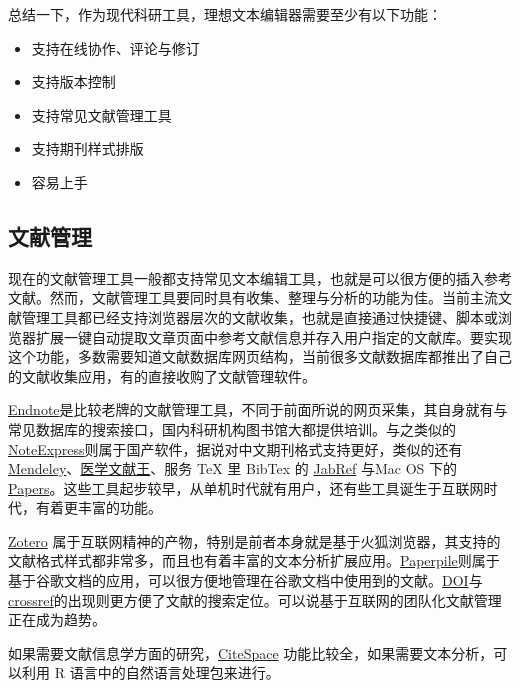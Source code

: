 \documentclass[]{tufte-book}
\providecommand{\tightlist}{%
  \setlength{\itemsep}{0pt}\setlength{\parskip}{0pt}}
\begin{document}
总结一下，作为现代科研工具，理想文本编辑器需要至少有以下功能：

\begin{itemize}
\tightlist
\item
  支持在线协作、评论与修订
\item
  支持版本控制
\item
  支持常见文献管理工具
\item
  支持期刊样式排版
\item
  容易上手
\end{itemize}

\hypertarget{ux6587ux732eux7ba1ux7406-1}{%
\subsection*{文献管理}\label{ux6587ux732eux7ba1ux7406-1}}

现在的文献管理工具一般都支持常见文本编辑工具，也就是可以很方便的插入参考文献。然而，文献管理工具要同时具有收集、整理与分析的功能为佳。当前主流文献管理工具都已经支持浏览器层次的文献收集，也就是直接通过快捷键、脚本或浏览器扩展一键自动提取文章页面中参考文献信息并存入用户指定的文献库。要实现这个功能，多数需要知道文献数据库网页结构，当前很多文献数据库都推出了自己的文献收集应用，有的直接收购了文献管理软件。

\href{https://endnote.com/}{Endnote}是比较老牌的文献管理工具，不同于前面所说的网页采集，其自身就有与常见数据库的搜索接口，国内科研机构图书馆大都提供培训。与之类似的\href{http://www.inoteexpress.com/aegean/}{NoteExpress}则属于国产软件，据说对中文期刊格式支持更好，类似的还有\href{https://www.mendeley.com/}{Mendeley}、\href{http://refer.medlive.cn/}{医学文献王}、服务 TeX 里 BibTex 的 \href{http://www.jabref.org/}{JabRef} 与Mac OS 下的\href{https://www.readcube.com/papers/mac}{Papers}。这些工具起步较早，从单机时代就有用户，还有些工具诞生于互联网时代，有着更丰富的功能。

\href{https://www.zotero.org/}{Zotero} 属于互联网精神的产物，特别是前者本身就是基于火狐浏览器，其支持的文献格式样式都非常多，而且也有着丰富的文本分析扩展应用。\href{https://paperpile.com/app}{Paperpile}则属于基于谷歌文档的应用，可以很方便地管理在谷歌文档中使用到的文献。\href{https://www.doi.org/}{DOI}与\href{https://www.crossref.org/}{crossref}的出现则更方便了文献的搜索定位。可以说基于互联网的团队化文献管理正在成为趋势。

如果需要文献信息学方面的研究，\href{http://cluster.cis.drexel.edu/~cchen/citespace/}{CiteSpace} 功能比较全，如果需要文本分析，可以利用 R 语言中的自然语言处理包来进行。
\end{document}
